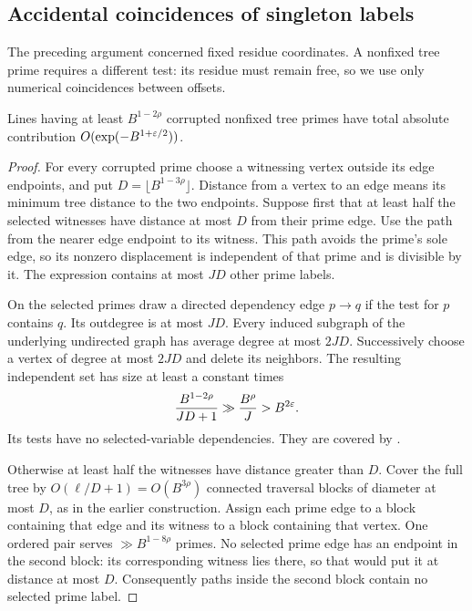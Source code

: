 \subsection{Accidental coincidences of singleton labels}

The preceding argument concerned fixed residue coordinates.  A
nonfixed tree prime requires a different test: its residue must
remain free, so we use only numerical coincidences between offsets.

\begin{lemma}\label{lem:few-corrupted}
Lines having at least $B^{1-2\rho}$ corrupted nonfixed tree primes
have total absolute contribution
$O(\exp(-B^{1+\varepsilon/2}))$.
\end{lemma}

\begin{proof}
For every corrupted prime choose a witnessing vertex outside its
edge endpoints, and put $D=\lfloor B^{1-3\rho}\rfloor$.  Distance
from a vertex to an edge means its minimum tree distance to the two
endpoints.  Suppose first that at least half the selected witnesses have distance at
most $D$ from their prime edge.  Use the path from the nearer edge
endpoint to its witness.  This path avoids the prime's sole edge,
so its nonzero displacement is independent of that prime and is
divisible by it.  The expression contains at most $JD$ other
prime labels.

On the selected primes draw a directed dependency edge $p\to q$
if the test for $p$ contains $q$.  Its outdegree is at most $JD$.
Every induced subgraph of the underlying undirected graph has
average degree at most $2JD$.  Successively choose a vertex of
degree at most $2JD$ and delete its neighbors.  The resulting
independent set has size at least a constant times
\[
 \frac{B^{1-2\rho}}{JD+1}\gg\frac{B^\rho}{J}>B^{2\varepsilon}.
\]
Its tests have no selected-variable dependencies.  They are
covered by .

Otherwise at least half the witnesses have distance greater than
$D$.  Cover the full tree by $O(\ell/D+1)=O(B^{3\rho})$ connected
traversal blocks of diameter at most $D$, as in the earlier
construction.  Assign each prime edge to a block containing that
edge and its witness to a block containing that vertex.  One
ordered pair serves $\gg B^{1-8\rho}$ primes.  No selected prime
edge has an endpoint in the second block: its corresponding
witness lies there, so that would put it at distance at most $D$.
Consequently paths inside the second block contain no selected
prime label.


\end{proof}
